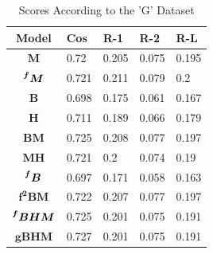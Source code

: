 \documentclass[conference]{IEEEtran}
\begin{document}
\begin{table}[htbp]
\caption{Scores According to the 'G' Dataset}
\begin{center}
\begin{tabular}{|S|a|a|a|a|}
\hline
\textbf{Model} & \textbf{Cos} & \textbf{R-1} & \textbf{R-2} & \textbf{R-L} \\
\hline
$\bm{M}$ & 0.72 & 0.205 & 0.075 & 0.195  \\
\hline
$\prescript{\bm{f}}{}{\bm{M}}$ & 0.721 & 0.211 & 0.079 & 0.2  \\
\hline
$\bm{B}$ & 0.698 & 0.175 & 0.061 &  0.167 \\
\hline
$\bm{H}$ & 0.711 & 0.189 & 0.066 & 0.179\\
\hline
$\bm{BM}$ & 0.725 & 0.208 & 0.077 & 0.197 \\
\hline
$\bm{MH}$ & 0.721 & 0.2 & 0.074 & 0.19   \\
\hline
$\prescript{\bm{f}}{}{\bm{B}}$ & 0.697 & 0.171 & 0.058 & 0.163  \\
\hline
$\bm{f^2 BM}$ & 0.722 & 0.207 & 0.077 & 0.197 \\
\hline
$\prescript{\bm{f}}{}{\bm{BHM}}$ & 0.725 & 0.201 & 0.075 & 0.191  \\
\hline
$\bm{gBHM}$ & 0.727 & 0.201 & 0.075 & 0.191\\
\hline
\end{tabular}
\label{Gskorlar}
\end{center}
\end{table}



\end{document}
